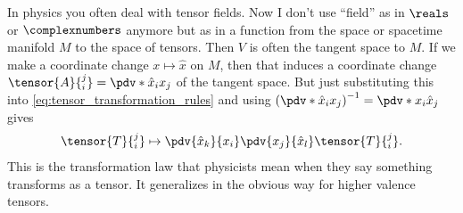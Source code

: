 In physics you often deal with tensor fields.
Now I don't use \enquote{field} as in $\reals$ or $\complexnumbers$ anymore but as in a function from the space or spacetime manifold $M$ to the space of tensors.
Then $V$ is often the tangent space to $M$.
If we make a coordinate change $x \mapsto \hat x$ on $M$, then that induces a coordinate change $\tensor{A}{_i^j} = \pdv*{\hat x_i}{x_j}$ of the tangent space.
But just substituting this into \cref{eq:tensor_transformation_rules} and using $\left(\pdv*{\hat x_i}{x_j}\right)^{-1} = \pdv*{x_i}{\hat x_j} $ gives
\begin{align*}
	\tensor{T}{_i^j} \mapsto \pdv{\hat x_k}{x_i} \pdv{x_j}{\hat x_l} \tensor{T}{_i^j}.
\end{align*}
This is the transformation law that physicists mean when they say something transforms as a tensor.
It generalizes in the obvious way for higher valence tensors.





